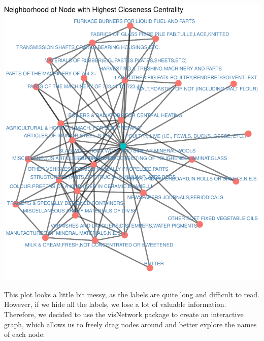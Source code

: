 \documentclass[
]{article}
\begin{document}
\includegraphics{export-network_files/figure-latex/unnamed-chunk-22-1.pdf}

This plot looks a little bit messy, as the labels are quite long and
difficult to read. However, if we hide all the labels, we lose a lot of
valuable information. Therefore, we decided to use the visNetwork
package to create an interactive graph, which allows us to freely drag
nodes around and better explore the names of each node:
\end{document}
